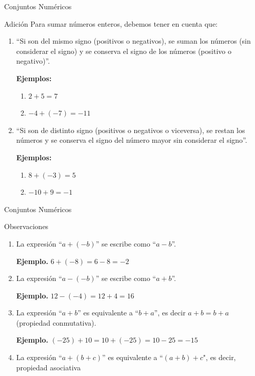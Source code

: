 \documentclass[10pt]{beamer}
\begin{document}
	\begin{frame}{Conjuntos Numéricos}
		\begin{block}{Adición}
			Para sumar números enteros, debemos tener en cuenta que:
			
			\begin{enumerate}
				\item “Si son del mismo signo (positivos o negativos), se suman los números (sin considerar el signo) y se conserva el signo de los números (positivo o negativo)”.
				
				\textbf{Ejemplos:}
				\begin{enumerate}
					\item \(2+5=7\)
					\item \(-4+(-7)=-11\)
				\end{enumerate}
				
				\pause
				
				\item “Si son de distinto signo (positivos o negativos o viceversa), se restan los números y se conserva el signo del número mayor sin considerar el signo”.
				
				\textbf{Ejemplos:}
				\begin{enumerate}
					\item \(8+(-3)=5\)
					\item \(-10+9=-1\)
				\end{enumerate}
			\end{enumerate}
		\end{block}
	\end{frame}
	
	\begin{frame}{Conjuntos Numéricos}
		\begin{block}{Observaciones}
			\begin{enumerate}
				\item La expresión “\(a+(-b)\)” se escribe como “\(a-b\)”.
				
				\textbf{Ejemplo.} \(6+(-8)=6-8=-2\)
				
				\pause
				
				\item La expresión “\(a-(-b)\)” se escribe como “\(a+b\)”.
				
				\textbf{Ejemplo.} \(12-(-4)=12+4=16\)
				
				\pause
				
				\item La expresión “\(a+b\)” es equivalente a “\(b+a\)”, es decir \(a+b=b+a\) (propiedad conmutativa).
				
				\textbf{Ejemplo.} \((-25)+10=10+(-25)=10-25=-15\)
				
				\pause
				
				\item La expresión “\(a+(b+c)\)” es equivalente a “\((a+b)+c\)", es decir, propiedad asociativa
			\end{enumerate}
		\end{block}	
	\end{frame}
\end{document}
